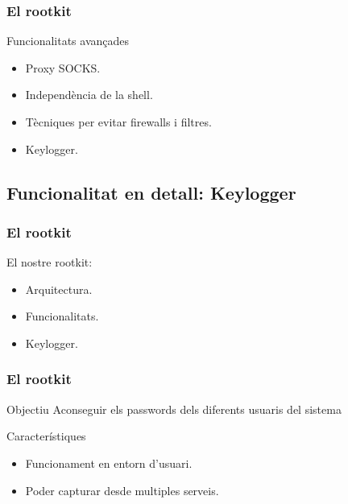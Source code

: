 \documentclass{beamer}
\begin{document}
\begin{frame}
	\frametitle{El rootkit}
	\begin{block}{Funcionalitats avançades}
		\begin{itemize}
			\item Proxy SOCKS.
				\pause
			\item Independència de la shell.
				\pause
			\item Tècniques per evitar firewalls i filtres.
				\pause
			\item Keylogger.
		\end{itemize}
	\end{block}
\end{frame}

\subsection{Funcionalitat en detall: Keylogger}

\begin{frame}
    \frametitle{El rootkit}
	\begin{block}{El nostre rootkit:}
		\begin{itemize}
			\item Arquitectura.
			\item Funcionalitats.
			\item \alert{Keylogger.}
		\end{itemize}
	\end{block}
\end{frame}

\begin{frame}
	\frametitle{El rootkit}
	\begin{block}{Objectiu}
		Aconseguir els passwords dels diferents usuaris del sistema
	\end{block}
	\begin{block}{Característiques}
		\begin{itemize}
			\item Funcionament en entorn d'usuari.
			\item Poder capturar desde multiples serveis.
		\end{itemize}
	\end{block}
\end{frame}
\end{document}
